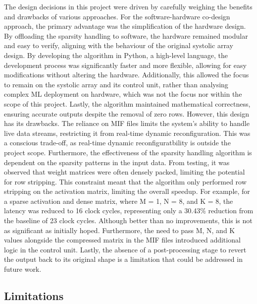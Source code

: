 \documentclass[12pt, a4paper, ukenglish]{article}
\begin{document}
    The design decisions in this project were driven by carefully weighing the benefits and drawbacks of various approaches. For the software-hardware co-design approach, the primary advantage was the simplification of the hardware design. By offloading the sparsity handling to software, the hardware remained modular and easy to verify, aligning with the behaviour of the original systolic array design. By developing the algorithm in Python, a high-level language, the development process was significantly faster and more flexible, allowing for easy modifications without altering the hardware. Additionally, this allowed the focus to remain on the systolic array and its control unit, rather than analysing complex ML deployment on hardware, which was not the focus nor within the scope of this project. Lastly, the algorithm maintained mathematical correctness, ensuring accurate outputs despite the removal of zero rows.
    \newline \newline
    However, this design has its drawbacks. The reliance on MIF files limits the system's ability to handle live data streams, restricting it from real-time dynamic reconfiguration. This was a conscious trade-off, as real-time dynamic reconfiguratbility is outside the project scope. Furthermore, the effectiveness of the sparsity handling algorithm is dependent on the sparsity patterns in the input data. From testing, it was observed that weight matrices were often densely packed, limiting the potential for row stripping. This constraint meant that the algorithm only performed row stripping on the activation matrix, limiting the overall speedup. For example, for a sparse activation and dense matrix, where M = 1, N = 8, and K = 8, the latency was reduced to 16 clock cycles, representing only a 30.43\% reduction from the baseline of 23 clock cycles. Although better than no improvements, this is not as significant as initially hoped. Furthermore, the need to pass M, N, and K values alongside the compressed matrix in the MIF files introduced additional logic in the control unit. Lastly, the absence of a post-processing stage to revert the output back to its original shape is a limitation that could be addressed in future work.


    \subsection{Limitations} \label{sec: limitations}
\end{document}
